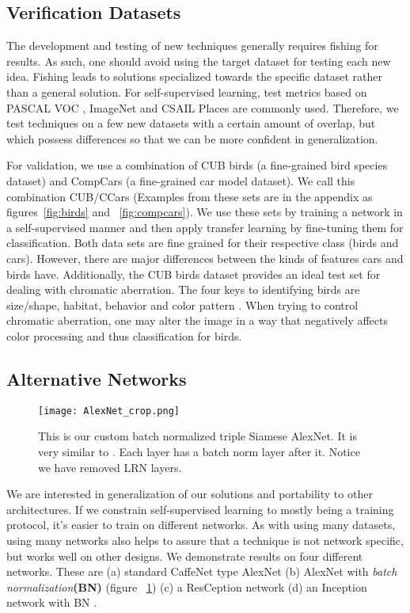 \documentclass[10pt,twocolumn,letterpaper]{article}
\begin{document}
\subsection{Verification Datasets}

The development and testing of new techniques generally requires fishing for results. As such, one should avoid using the target dataset for testing each new idea. Fishing leads to solutions specialized towards the specific dataset rather than a general solution. For self-supervised learning, test metrics based on PASCAL VOC \cite{Everingham10}, ImageNet \cite{Imagenet09} and CSAIL Places \cite{Places14} are commonly used. Therefore, we test techniques on a few new datasets with a certain amount of overlap, but which possess differences so that we can be more confident in generalization. 

For validation, we use a combination of CUB birds \cite{Welinder10} (a fine-grained bird species dataset) and CompCars \cite{Yang15} (a fine-grained car model dataset). We call this combination CUB/CCars (Examples from these sets are in the appendix as figures~\ref{fig:birds} and ~\ref{fig:compcars}). We use these sets by training a network in a self-supervised manner and then apply transfer learning by fine-tuning them for classification. Both data sets are fine grained for their respective class (birds and cars). However, there are major differences between the kinds of features cars and birds have. Additionally, the CUB birds dataset provides an ideal test set for dealing with chromatic aberration. The four keys to identifying birds are size/shape, habitat, behavior and color pattern \cite{Cornell09}. When trying to control chromatic aberration, one may alter the image in a way that negatively affects color processing and thus classification for birds.

\subsection{Alternative Networks}

\begin{figure}
\centering
\texttt{[image: AlexNet\_crop.png]}
\caption{This is our custom batch normalized triple Siamese AlexNet. It is very similar to \cite{Doersch15}. Each layer has a batch norm layer after it. Notice we have removed LRN \cite{AlexNet} layers.}
\label{fig:alexnet}
\end{figure}
We are interested in generalization of our solutions and portability to other architectures. If we constrain self-supervised learning to mostly being a training protocol, it's easier to train on different networks. As with using many datasets, using many networks also helps to assure that a technique is not network specific, but works well on other designs. We demonstrate results on four different networks. These are (a) standard CaffeNet type AlexNet \cite{AlexNet,Caffe} (b) AlexNet with \emph{batch normalization}{\bf (BN)} \cite{BatchNorm} (figure ~\ref{fig:alexnet}) (c) a ResCeption network \cite{Mundhenk2016} (d) an Inception network with BN \cite{Inceptionv4,BatchNorm}.
\end{document}
